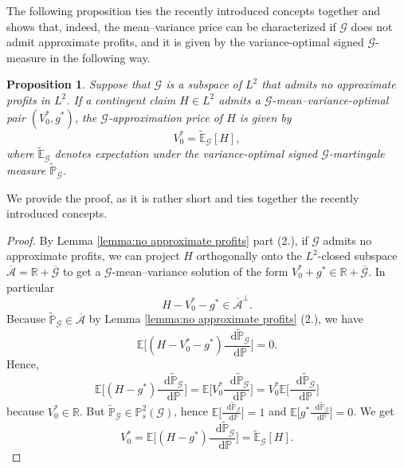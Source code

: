 \documentclass[11pt,a4paper,twoside,openany]{report}
\numberwithin{equation}{section}
\newcommand{\diff}{\mathop{}\!\mathrm{d}}
\theoremstyle{plain} %
\newtheorem{proposition}[theorem]{Proposition}
\theoremstyle{definition} %
\theoremstyle{remark} %
\begin{document}
The following proposition ties the recently introduced concepts together and shows that, indeed, the mean--variance price can be characterized if \(\mathcal{G}\) does not admit approximate profits, and it is given by the variance-optimal signed \(\mathcal{G}\)-measure in the following way.
\begin{proposition}\label{prop:mean--variance price}
Suppose that $\mathcal{G}$ is a subspace of $L^2$ that admits no
approximate profits in $L^2$. If a contingent claim $H\in L^2$ admits a
$\mathcal{G}$-mean--variance-optimal pair $(V_0^*,g^*)$, the
$\mathcal{G}$-approximation price of $H$ is given by
\[
V_0^*=\widetilde{\mathbb{E}}_{\mathcal{G}}[H],
\]
where $\widetilde{\mathbb{E}}_{\mathcal{G}}$ denotes expectation under the variance-optimal
signed $\mathcal{G}$-martingale measure $\widetilde{\mathbb{P}}_{\mathcal{G}}$.
\end{proposition}
We provide the proof, as it is rather short and ties together the recently introduced concepts.
\begin{proof}
    By Lemma \ref{lemma:no approximate profits} part (2.), if \(\mathcal{G}\) admits no approximate profits, we can project \(H\) orthogonally onto the \(L^2\)-closed subspace \(\overline{\mathcal{A}}=\mathbb{R}+\overline{\mathcal{G}}
    \) to get a \(\mathcal{G}\)-mean--variance solution of the form \(V_0^*+g^*\in \mathbb{R}+\overline{\mathcal{G}}\). In particular
    \begin{equation*}
        H-V_0^*-g^*\in\overline{\mathcal{A}}^{\perp}.
    \end{equation*}
   Because \(\widetilde{\mathbb{P}}_{\mathcal{G}}\in\overline{\mathcal{A}}\) by Lemma \ref{lemma:no approximate profits} (2.), we have 
    \begin{equation*}
        \mathbb{E}\bigg[(H-V_0^*-g^*)\frac{\diff \widetilde{\mathbb{P}}_{\mathcal{G}}}{\diff \mathbb{P}}\bigg]=0.
    \end{equation*}
    Hence, 
    \begin{equation*}
        \mathbb{E}\bigg[(H-g^*)\frac{\diff \widetilde{\mathbb{P}}_{\mathcal{G}}}{\diff \mathbb{P}}\bigg]=\mathbb{E}\bigg[V_0^*\frac{\diff \widetilde{\mathbb{P}}_{\mathcal{G}}}{\diff \mathbb{P}}\bigg]=V_0^*\mathbb{E}\bigg[\frac{\diff \widetilde{\mathbb{P}}_{\mathcal{G}}}{\diff \mathbb{P}}\bigg]
    \end{equation*}
    because \(V_0^*\in\mathbb{R}\). But \(\widetilde{\mathbb{P}}_{\mathcal{G}}\in\mathbb{P}^2_s(\mathcal{G})\), hence \(\mathbb{E}\bigg[\frac{\diff\widetilde{\mathbb{P}}_{\mathcal{G}}}{\diff \mathbb{P}}\bigg]=1\) and \(\mathbb{E}\Big[g^*\frac{\diff\widetilde{\mathbb{P}}_{\mathcal{G}}}{\diff \mathbb{P}}\Big]=0\). We get
    \begin{equation*}
        V_0^*=\mathbb{E}\bigg[(H-g^*)\frac{\diff\widetilde{\mathbb{P}}_{\mathcal{G}}}{\diff \mathbb{P}}\bigg]=\widetilde{\mathbb{E}}_{\mathcal{G}}[H].
    \end{equation*}
\end{proof}
\end{document}

